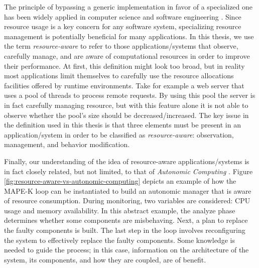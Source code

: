 The principle of bypassing a generic implementation in favor of a specialized one has been widely applied in computer science and software engineering \cite{engler1995exokernel, Munro1996,Dragos:2009:CGT:1565824.1565830,Marinos:2014:NSS:2619239.2626311}.
Since resource usage is a key concern for any software system, specializing resource management is potentially beneficial for many applications.
In this thesis, we use the term \textit{resource-aware} to refer to those applications/systems that observe, carefully manage, and are aware of computational resources in order to improve their performance. 
At first, this definition might look too broad, but in reality most applications limit themselves to carefully use the resource allocations facilities offered by runtime environments.
Take for example a web server that uses a pool of threads to process remote requests.
By using this pool the server is in fact carefully managing resource, but with this feature alone it is not able to observe whether the pool's size should be decreased/increased.
The key issue in the definition used in this thesis is that three elements must be present in an application/system in order to be classified as \textit{resource-aware}: observation, management, and behavior modification.

 
Finally, our understanding of the idea of resource-aware applications/systems is in fact closely related, but not limited, to that of \textit{Autonomic Computing} \cite{Horn2001,kephart03,Brun:2009:ESS:1573856.1573860}.
Figure \ref{fig:resource-aware-vs-autonomic-computing} depicts an example of how the MAPE-K loop can be instantiated to build an autonomic manager that is aware of resource consumption.
During monitoring, two variables are considered: CPU usage and memory availability.
In this abstract example, the analyze phase determines whether some components are misbehaving.
Next, a plan to replace the faulty components is built.
The last step in the loop involves reconfiguring the system to effectively replace the faulty components.
Some knowledge is needed to guide the process; in this case, information on the architecture of the system, its components, and how they are coupled, are of benefit.

